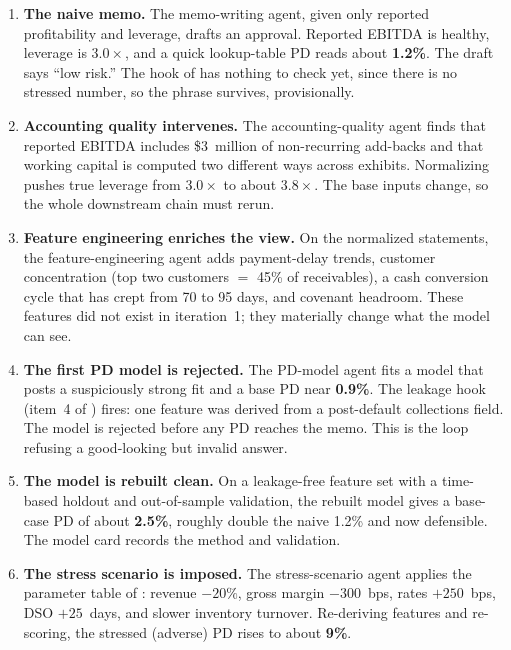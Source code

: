 \begin{enumerate}
\item \textbf{The naive memo.} The memo-writing agent, given only reported
profitability and leverage, drafts an approval. Reported EBITDA is healthy,
leverage is $3.0\times$, and a quick lookup-table PD reads about \textbf{1.2\%}. The
draft says ``low risk.'' The hook of  has nothing to check
yet, since there is no stressed number, so the phrase survives, provisionally.

\item \textbf{Accounting quality intervenes.} The accounting-quality agent finds
that reported EBITDA includes \$3~million of non-recurring add-backs and that
working capital is computed two different ways across exhibits. Normalizing pushes
true leverage from $3.0\times$ to about $3.8\times$. The base inputs change, so the
whole downstream chain must rerun.

\item \textbf{Feature engineering enriches the view.} On the normalized statements,
the feature-engineering agent adds payment-delay trends, customer concentration
(top two customers $=$ 45\% of receivables), a cash conversion cycle that has crept
from 70 to 95 days, and covenant headroom. These features did not exist in
iteration~1; they materially change what the model can see.

\item \textbf{The first PD model is rejected.} The PD-model agent fits a model that
posts a suspiciously strong fit and a base PD near \textbf{0.9\%}. The leakage hook
(item~4 of ) fires: one feature was derived from a
post-default collections field. The model is rejected before any PD reaches the
memo. This is the loop refusing a good-looking but invalid answer.

\item \textbf{The model is rebuilt clean.} On a leakage-free feature set with a
time-based holdout and out-of-sample validation, the rebuilt model gives a base-case
PD of about \textbf{2.5\%}, roughly double the naive 1.2\% and now defensible.
The model card records the method and validation.

\item \textbf{The stress scenario is imposed.} The stress-scenario agent applies the
parameter table of : revenue $-20\%$, gross margin
$-300$~bps, rates $+250$~bps, DSO $+25$~days, and slower inventory turnover.
Re-deriving features and re-scoring, the stressed (adverse) PD rises to about
\textbf{9\%}.


\end{enumerate}
